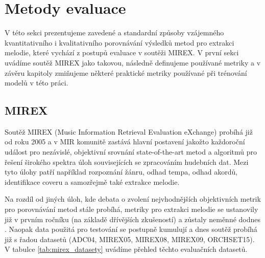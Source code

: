 \chapter{Metody evaluace}\label{cha:evaluace}

V této sekci prezentujeme zavedené a standardní způsoby vzájemného kvantitativního i kvalitativního porovnávání výsledků metod pro extrakci melodie, které vychází z postupů evaluace v soutěži MIREX. V první sekci uvádíme soutěž MIREX jako takovou, následně definujeme používané metriky a v závěru kapitoly zmiňujeme některé praktické metriky používané při trénování modelů v této práci.

\section{MIREX}

Soutěž MIREX (Music Information Retrieval Evaluation eXchange) probíhá již od roku 2005 a v MIR komunitě zastává hlavní postavení jakožto každoroční událost pro nezávislé, objektivní srovnání state-of-the-art metod a algoritmů pro řešení širokého spektra úloh souvisejících se zpracováním hudebních dat. Mezi tyto úlohy patří například rozpoznání žánru, odhad tempa, odhad akordů, identifikace coveru a samozřejmě také extrakce melodie.

Na rozdíl od jiných úloh, kde debata o zvolení nejvhodnějších objektivních metrik pro porovnávání metod stále probíhá, metriky pro extrakci melodie se ustanovily již v prvním ročníku (na základě dřívějších zkušeností) a zůstaly neměnné dodnes \citep{Raffel2014}. Naopak data použitá pro testování se postupně kumulují a dnes soutěž probíhá již s řadou datasetů (ADC04, MIREX05, MIREX08, MIREX09, ORCHSET15). V tabulce \ref{tab:mirex_datasety} uvádíme přehled těchto evaluačních datasetů.

